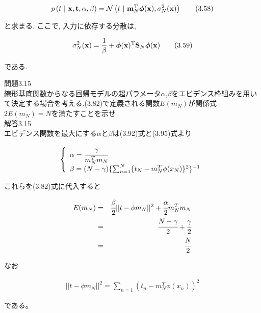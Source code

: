 \documentclass{jsarticle}
\begin{document}
\begin{align*}
p \left (t ~ | ~ \mathbf x,\mathbf t,\alpha,\beta \right ) = \mathcal { N } \left (t ~ | ~ \mathbf m^\textrm T_N \boldsymbol \phi (\mathbf x),\sigma ^2_N (\mathbf x) \right ) 
\tag{3.58}
\end{align*}

と求まる. 
ここで, 入力に依存する分散は, 

\begin{align*}
\sigma ^ 2 _ N (\mathbf x) = \frac{1}{\beta}+\boldsymbol \phi (\mathbf x)^\textrm T \mathbf S_N \boldsymbol \phi (\mathbf x)
\tag{3.59}
\end{align*}

である.

問題3.15 \\
線形基底関数からなる回帰モデルの超パラメータ$\alpha$,$\beta$をエビデンス枠組みを用いて決定する場合を考える.(3.82)で定義される関数$E(m_N)$が関係式
$2E(m_N) = N$を満たすことを示せ\\

解答3.15 \\
エビデンス関数を最大にする$\alpha$と$\beta$は(3.92)式と(3.95)式より

\begin{align*}
    \left\{
        \begin{array}{l}
            \alpha = \cfrac{\gamma}{m_N^T m_N} \\
            \beta = (N-\gamma)\{ \sum_{n=1}^N \{ t_N - m_N^T \phi(x_N) \}^2 \}^{-1}
        \end{array}
        \right.
\end{align*}

これらを(3.82)式に代入すると

\begin{eqnarray*}
    E(m_N) &=& \cfrac{\beta}{2}|| t - \phi m_N ||^2 + \cfrac{\alpha}{2} m_N^T m_N \\
    &=& \cfrac{N-\gamma}{2} + \cfrac{\gamma}{2} \\
    &=& \cfrac{N}{2}
\end{eqnarray*}

なお

\begin{align*}
    || t - \phi m_N ||^2 = \sum_{n=1} (t_n - m_N^T \phi(x_n))^2
\end{align*}

である。
\end{document}
